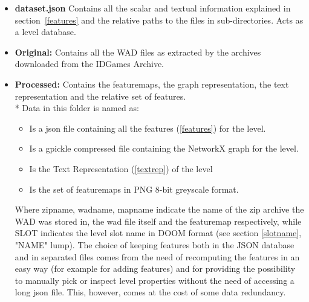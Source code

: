  \begin{itemize}
 	\item \textbf{dataset.json} Contains all the scalar and textual information explained in section~\ref{features} and the relative paths to the files in sub-directories. Acts as a level database. 
 	\item \textbf{Original:} Contains all the WAD files as extracted by the archives downloaded from the IDGames Archive.
 	\item \textbf{Processed:} Contains the \glspl{featuremap}, the graph representation, the text representation and the relative set of features. \\*
 	Data in this folder is named as:
 	\begin{itemize}
		\item [\textbf{zipname\textunderscore WADNAME\textunderscore SLOT.json}] Is a json file containing all the features (\ref{features}) for the level.
		\item [\textbf{zipname\textunderscore WADNAME\textunderscore SLOT.networkx}] Is a gpickle compressed file containing the NetworkX graph for the level.
		\item [\textbf{zipname\textunderscore WADNAME\textunderscore SLOT.txt}] Is the Text Representation (\ref{textrep}) of the level
		\item [\textbf{zipname\textunderscore WADNAME\textunderscore SLOT\textunderscore mapname.txt}] Is the set of \glspl{featuremap} in PNG 8-bit greyscale format. 
 	\end{itemize}
 	Where zipname, wadname, mapname indicate the name of the zip archive the \gls{WAD} was stored in, the wad file itself and the \gls{featuremap} respectively, while SLOT indicates the level slot name in DOOM format (see section \ref{slotname}, "NAME" lump).
 	The choice of keeping features both in the JSON database and in separated files comes from the need of recomputing the features in an easy way (for example for adding features) and for providing the possibility to manually pick or inspect level properties without the need of accessing a long json file. This, however, comes at the cost of some data redundancy. 
 \end{itemize}


 
